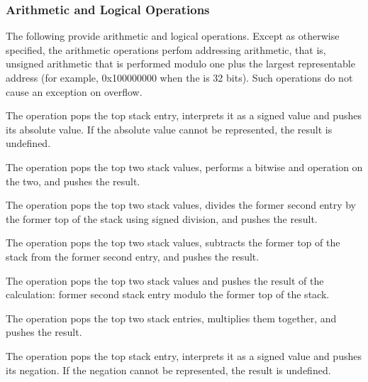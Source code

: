 \subsubsection{Arithmetic and Logical Operations}
The 
following 
provide arithmetic and logical operations. Except
as otherwise specified, the arithmetic operations perfom
addressing arithmetic, that is, unsigned arithmetic that is
performed modulo one plus the largest representable address
(for example, 0x100000000 when the 
 is 32 bits). 
Such operations do not cause an exception on overflow.

\begin{enumerate}[1. ]
The  operation pops the top stack entry, interprets
it as a signed value and pushes its absolute value. If the
absolute value cannot be represented, the result is undefined.

The  operation pops the top two stack values, performs
a bitwise and operation on the two, and pushes the result.

The  operation pops the top two stack values, divides the former second entry by
the former top of the stack using signed division, and pushes the result.

The  operation pops the top two stack values, subtracts the former top of the
stack from the former second entry, and pushes the result.

The  operation pops the top two stack values and pushes the result of the
calculation: former second stack entry modulo the former top of the stack.

The  operation pops the top two stack entries, multiplies them together, and
pushes the result.

The  operation pops the top stack entry, interprets
it as a signed value and pushes its negation. If the negation
cannot be represented, the result is undefined.


\end{enumerate}

